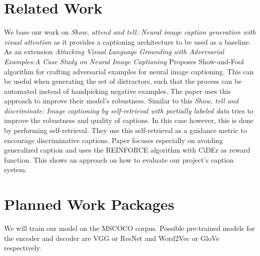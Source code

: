 \documentclass[12pt]{article}
\begin{document}
\section{Related Work}

We base our work on \textit{Show, attend and tell: Neural image caption generation with visual attention} \cite{xu2015show} as it provides a captioning architecture to be used as a baseline.
As an extension \textit{Attacking Visual Language Grounding with Adversarial Examples:A Case Study on Neural Image Captioning} \cite{chen2017attacking} Proposes Show-and-Fool algorithm for crafting adversarial examples for neural image captioning. This can be useful when generating the set of distractors, such that the process can be automated instead of handpicking negative examples. The paper uses this approach to improve their model’s robustness.
Similar to this \textit{Show, tell and discriminate: Image captioning by self-retrieval with partially labeled data} \cite{liu2018show}  tries to improve the robustness and quality of captions. In this case however, this is done by performing self-retrieval. They use this self-retrieval as a guidance metric to encourage discriminative captions. Paper focuses especially on avoiding generalized caption and uses the REINFORCE algorithm with CiDEr as reward function. This shows an approach on how to evaluate our project’s caption system.

\section{Planned Work Packages}

We will train our model on the MSCOCO corpus.
Possible pre-trained models for the encoder and decoder are VGG or ResNet and Word2Vec or GloVe respectively.



\newpage

 

\end{document}
